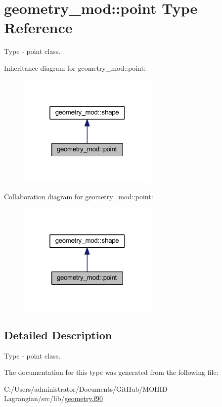 \hypertarget{structgeometry__mod_1_1point}{}\section{geometry\+\_\+mod\+:\+:point Type Reference}
\label{structgeometry__mod_1_1point}


Type -\/ point class.  




Inheritance diagram for geometry\+\_\+mod\+:\+:point\+:\nopagebreak
\begin{figure}[H]
\begin{center}
\leavevmode
\includegraphics[width=193pt]{structgeometry__mod_1_1point__inherit__graph}
\end{center}
\end{figure}


Collaboration diagram for geometry\+\_\+mod\+:\+:point\+:\nopagebreak
\begin{figure}[H]
\begin{center}
\leavevmode
\includegraphics[width=193pt]{structgeometry__mod_1_1point__coll__graph}
\end{center}
\end{figure}


\subsection{Detailed Description}
Type -\/ point class. 

The documentation for this type was generated from the following file\+:\begin{DoxyCompactItemize}
\item 
C\+:/\+Users/administrator/\+Documents/\+Git\+Hub/\+M\+O\+H\+I\+D-\/\+Lagrangian/src/lib/\hyperlink{geometry_8f90}{geometry.\+f90}\end{DoxyCompactItemize}
